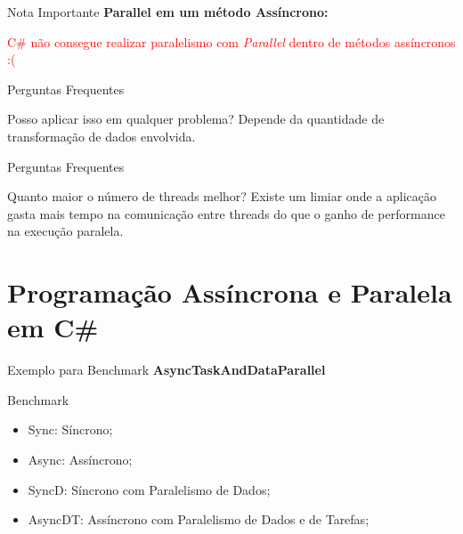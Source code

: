 \documentclass[10pt]{beamer}
\begin{document}
\begin{frame}{Nota Importante}
	\textbf{Parallel em um método Assíncrono:} 
	\vspace{0.3cm}
	
	\textcolor{red}{C\# não consegue realizar paralelismo com \textit{Parallel} dentro de métodos assíncronos :(}
\end{frame}

\begin{frame}{Perguntas Frequentes}
	\begin{exampleblock}{Posso aplicar isso em qualquer problema?}
		Depende da quantidade de transformação de dados envolvida.
	\end{exampleblock}
\end{frame}

\begin{frame}{Perguntas Frequentes}
	\begin{exampleblock}{Quanto maior o número de threads melhor?}
		Existe um limiar onde a aplicação gasta mais tempo na comunicação entre threads do que o ganho de performance na execução paralela.
	\end{exampleblock}
\end{frame}

\section{Programação Assíncrona e Paralela em C\#}

\begin{frame}{Exemplo para Benchmark}
	\textbf{AsyncTaskAndDataParallel}
\end{frame}

\begin{frame}{Benchmark}
	\begin{figure}
	\end{figure}
	\vspace{-0.5cm}
	\scriptsize
	\begin{itemize}
		\item Sync: Síncrono;
		\item Async: Assíncrono;
		\item SyncD: Síncrono com Paralelismo de Dados;
		\item AsyncDT: Assíncrono com Paralelismo de Dados e de Tarefas;
	\end{itemize}
\end{frame}
\end{document}
